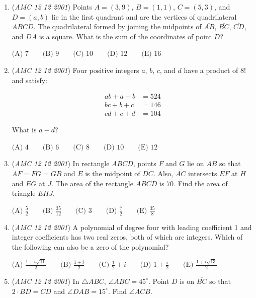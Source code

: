 \begin{enumerate}
	\item (\textit{AMC 12 12 2001}) Points $A = (3,9)$, $B = (1,1)$, $C = (5,3)$, and $D=(a,b)$ lie in the first quadrant and are the vertices of quadrilateral $ABCD$. The quadrilateral formed by joining the midpoints of $\overline{AB}$, $\overline{BC}$, $\overline{CD}$, and $\overline{DA}$ is a square. What is the sum of the coordinates of point $D$?


 $\text{(A) }7 \qquad \text{(B) }9 \qquad \text{(C) }10 \qquad \text{(D) }12 \qquad \text{(E) }16$


	\item (\textit{AMC 12 12 2001}) Four positive integers $a$, $b$, $c$, and $d$ have a product of $8!$ and satisfy:


 
 \begin{align*} ab + a + b & = 524 \\  bc + b + c & = 146 \\  cd + c + d & = 104 \end{align*}



 What is $a-d$?


 $\text{(A) }4 \qquad \text{(B) }6 \qquad \text{(C) }8 \qquad \text{(D) }10 \qquad \text{(E) }12$


	\item (\textit{AMC 12 12 2001}) In rectangle $ABCD$, points $F$ and $G$ lie on $AB$ so that $AF=FG=GB$ and $E$ is the midpoint of $\overline{DC}$. Also, $\overline{AC}$ intersects $\overline{EF}$ at $H$ and $\overline{EG}$ at $J$. The area of the rectangle $ABCD$ is $70$. Find the area of triangle $EHJ$.


 $\text{(A) }\frac {5}{2} \qquad \text{(B) }\frac {35}{12} \qquad \text{(C) }3 \qquad \text{(D) }\frac {7}{2} \qquad \text{(E) }\frac {35}{8}$


	\item (\textit{AMC 12 12 2001}) A polynomial of degree four with leading coefficient 1 and integer coefficients has two real zeros, both of which are integers. Which of the following can also be a zero of the polynomial?


 $\text{(A) }\frac {1 + i \sqrt {11}}{2} \qquad \text{(B) }\frac {1 + i}{2} \qquad \text{(C) }\frac {1}{2} + i \qquad \text{(D) }1 + \frac {i}{2} \qquad \text{(E) }\frac {1 + i \sqrt {13}}{2}$


	\item (\textit{AMC 12 12 2001}) In $\triangle ABC$, $\angle ABC=45^\circ$. Point $D$ is on $\overline{BC}$ so that $2\cdot BD=CD$ and $\angle DAB=15^\circ$. Find $\angle ACB$.



\end{enumerate}
